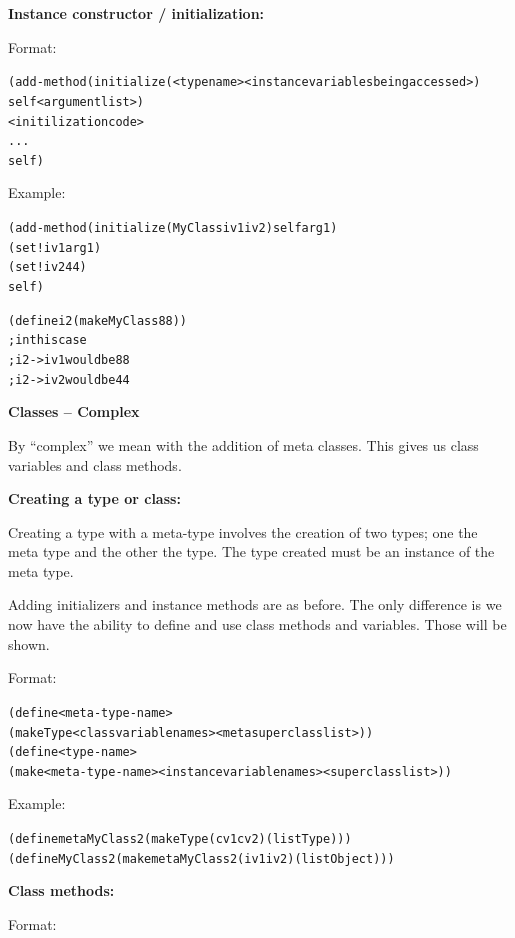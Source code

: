 \documentclass[12pt]{article}
\begin{document}
\textbf{Instance constructor / initialization:}

Format:

\begin{alltt}
   (add-method (initialize  (<type name>  <instance variables being accessed>)
                            self  <argument list>)
                     <initilization code>
                     ...
                     self)
\end{alltt}

Example:

\begin{alltt}
   (add-method (initialize (MyClass iv1 iv2) self arg1)
        (set! iv1 arg1)
        (set! iv2 44)
        self)

    (define i2 (make MyClass 88))
    ; in this case
    ; i2->iv1 would be 88
    ; i2->iv2 would be 44
\end{alltt}

\newpage

{\large \bfseries Classes -- Complex}

By ``complex'' we mean with the addition of meta classes.  This gives us class variables and class methods.

\textbf{Creating a type or class:}

Creating a type with a meta-type involves the creation of two types; one the meta type and the other the type.
The type created must be an instance of the meta type.

Adding initializers and instance methods are as before.  The only difference is we now have the ability
to define and use class methods and variables.  Those will be shown.

Format:

\begin{alltt}
   (define <meta-type-name>
           (make Type <class variable names> <meta superclass list>))
   (define <type-name>
           (make <meta-type-name>  <instance variable names>  <superclass list>))
\end{alltt}

Example:

\begin{alltt}
    (define metaMyClass2 (make Type \textquotesingle{}(cv1 cv2) (list Type)))
    (define MyClass2 (make metaMyClass2 \textquotesingle{}(iv1 iv2) (list Object)))
\end{alltt}

\textbf{Class methods:}

Format:
\end{document}
